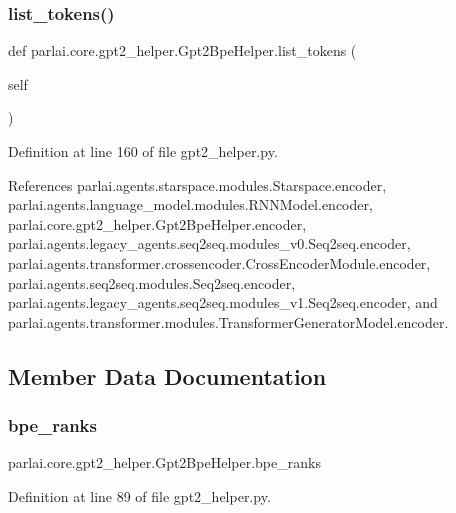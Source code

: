 \subsubsection{\texorpdfstring{list\+\_\+tokens()}{list\_tokens()}}
{\footnotesize\ttfamily def parlai.\+core.\+gpt2\+\_\+helper.\+Gpt2\+Bpe\+Helper.\+list\+\_\+tokens (\begin{DoxyParamCaption}\item[{}]{self }\end{DoxyParamCaption})}



Definition at line 160 of file gpt2\+\_\+helper.\+py.



References parlai.\+agents.\+starspace.\+modules.\+Starspace.\+encoder, parlai.\+agents.\+language\+\_\+model.\+modules.\+R\+N\+N\+Model.\+encoder, parlai.\+core.\+gpt2\+\_\+helper.\+Gpt2\+Bpe\+Helper.\+encoder, parlai.\+agents.\+legacy\+\_\+agents.\+seq2seq.\+modules\+\_\+v0.\+Seq2seq.\+encoder, parlai.\+agents.\+transformer.\+crossencoder.\+Cross\+Encoder\+Module.\+encoder, parlai.\+agents.\+seq2seq.\+modules.\+Seq2seq.\+encoder, parlai.\+agents.\+legacy\+\_\+agents.\+seq2seq.\+modules\+\_\+v1.\+Seq2seq.\+encoder, and parlai.\+agents.\+transformer.\+modules.\+Transformer\+Generator\+Model.\+encoder.



\subsection{Member Data Documentation}
\mbox{\label{classparlai_1_1core_1_1gpt2__helper_1_1Gpt2BpeHelper_a3138a0a7614de78ee773642fbe6ddaae}} 
\subsubsection{\texorpdfstring{bpe\+\_\+ranks}{bpe\_ranks}}
{\footnotesize\ttfamily parlai.\+core.\+gpt2\+\_\+helper.\+Gpt2\+Bpe\+Helper.\+bpe\+\_\+ranks}



Definition at line 89 of file gpt2\+\_\+helper.\+py.



